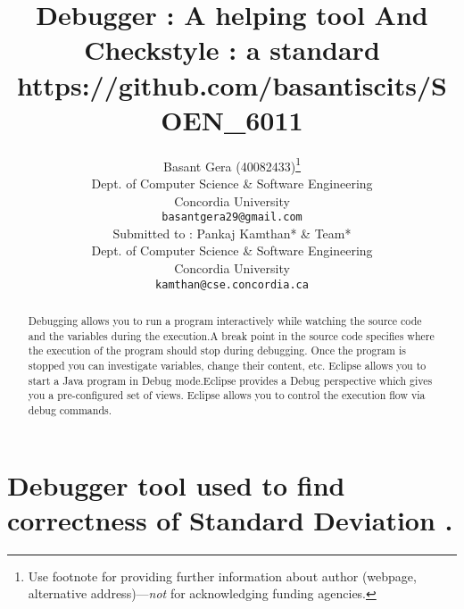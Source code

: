 \documentclass{article}
\title{Debugger : A helping tool And  Checkstyle : a standard\\ https://github.com/basantiscits/SOEN\_6011}
\author{
  Basant Gera (40082433)\thanks{Use footnote for providing further
    information about author (webpage, alternative
    address)---\emph{not} for acknowledging funding agencies.} \\
  Dept. of Computer Science \& Software Engineering\\
  Concordia University\\
  \texttt{basantgera29@gmail.com} \\
   \And
Submitted to : Pankaj Kamthan* \& Team*\\
   Dept. of Computer Science \& Software Engineering\\
  Concordia University\\
  \texttt{kamthan@cse.concordia.ca} \\
}
\begin{document}
\maketitle

\begin{abstract}
Debugging allows you to run a program interactively while watching the source code and the variables during the execution.A break point in the source code specifies where the execution of the program should stop during debugging. Once the program is stopped you can investigate variables, change their content, etc. Eclipse allows you to start a Java program in Debug mode.Eclipse provides a Debug perspective which gives you a pre-configured set of views. Eclipse allows you to control the execution flow via debug commands.
\end{abstract}

\section{Debugger tool used to find correctness of Standard Deviation .}
\end{document}
